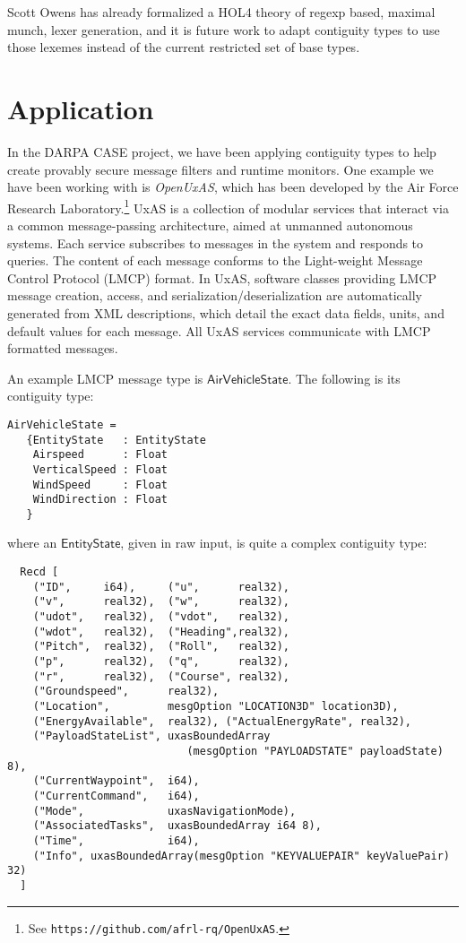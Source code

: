 \documentclass[a4paper,UKenglish,cleveref, autoref, thm-restate]{lipics-v2021}
\newcommand{\konst}[1]{\ensuremath{\mathsf{#1}}}
\begin{document}
Scott Owens has already formalized a HOL4 theory of regexp based,
maximal munch, lexer generation, and it is future work to adapt
contiguity types to use those lexemes instead of the current
restricted set of base types.

\section{Application}\label{application}

In the DARPA CASE project, we have been applying contiguity types to
help create provably secure message filters and runtime monitors. One
example we have been working with is \emph{OpenUxAS}, which has been
developed by the Air Force Research Laboratory.\footnote{See
  \texttt{https://github.com/afrl-rq/OpenUxAS}.}  UxAS is a collection
of modular services that interact via a common message-passing
architecture, aimed at unmanned autonomous systems.  Each service
subscribes to messages in the system and responds to queries. The
content of each message conforms to the Light-weight Message Control
Protocol (LMCP) format. In UxAS, software classes providing LMCP
message creation, access, and serialization/deserialization are
automatically generated from XML descriptions, which detail the exact
data fields, units, and default values for each message. All UxAS
services communicate with LMCP formatted messages.

An example LMCP message type is \konst{AirVehicleState}. The following
is its contiguity type:

{\small
\begin{verbatim}
AirVehicleState =
   {EntityState   : EntityState
    Airspeed      : Float
    VerticalSpeed : Float
    WindSpeed     : Float
    WindDirection : Float
   }
\end{verbatim}
}
\noindent where an \konst{EntityState}, given in raw input, is quite a complex contiguity type:
{\small
\begin{verbatim}
  Recd [
    ("ID",     i64),     ("u",      real32),
    ("v",      real32),  ("w",      real32),
    ("udot",   real32),  ("vdot",   real32),
    ("wdot",   real32),  ("Heading",real32),
    ("Pitch",  real32),  ("Roll",   real32),
    ("p",      real32),  ("q",      real32),
    ("r",      real32),  ("Course", real32),
    ("Groundspeed",      real32),
    ("Location",         mesgOption "LOCATION3D" location3D),
    ("EnergyAvailable",  real32), ("ActualEnergyRate", real32),
    ("PayloadStateList", uxasBoundedArray
                            (mesgOption "PAYLOADSTATE" payloadState) 8),
    ("CurrentWaypoint",  i64),
    ("CurrentCommand",   i64),
    ("Mode",             uxasNavigationMode),
    ("AssociatedTasks",  uxasBoundedArray i64 8),
    ("Time",             i64),
    ("Info", uxasBoundedArray(mesgOption "KEYVALUEPAIR" keyValuePair) 32)
  ]
\end{verbatim}
}
\end{document}
